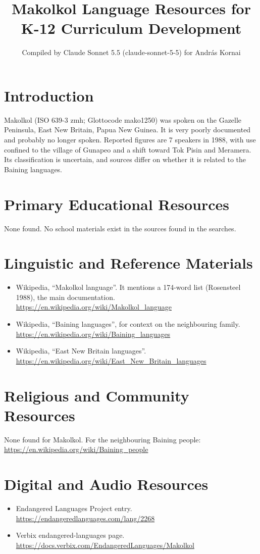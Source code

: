 \documentclass[12pt]{article}
\title{Makolkol Language Resources for K-12 Curriculum Development}
\author{Compiled by Claude Sonnet 5.5 (claude-sonnet-5-5) for Andr\'as Kornai}
\date{}
\begin{document}
\maketitle

\section{Introduction}
Makolkol (ISO 639-3 zmh; Glottocode mako1250) was spoken on the Gazelle Peninsula, East New Britain, Papua New Guinea. It is very poorly documented and probably no longer spoken. Reported figures are 7 speakers in 1988, with use confined to the village of Gunapeo and a shift toward Tok Pisin and Meramera. Its classification is uncertain, and sources differ on whether it is related to the Baining languages.

\section{Primary Educational Resources}
None found. No school materials exist in the sources found in the searches.

\section{Linguistic and Reference Materials}
\begin{itemize}
\item Wikipedia, ``Makolkol language''. It mentions a 174-word list (Rosensteel 1988), the main documentation. \url{https://en.wikipedia.org/wiki/Makolkol_language}
\item Wikipedia, ``Baining languages'', for context on the neighbouring family. \url{https://en.wikipedia.org/wiki/Baining_languages}
\item Wikipedia, ``East New Britain languages''. \url{https://en.wikipedia.org/wiki/East_New_Britain_languages}
\end{itemize}

\section{Religious and Community Resources}
None found for Makolkol. For the neighbouring Baining people: \url{https://en.wikipedia.org/wiki/Baining_people}

\section{Digital and Audio Resources}
\begin{itemize}
\item Endangered Languages Project entry. \url{https://endangeredlanguages.com/lang/2268}
\item Verbix endangered-languages page. \url{https://docs.verbix.com/EndangeredLanguages/Makolkol}
\end{itemize}
\end{document}
